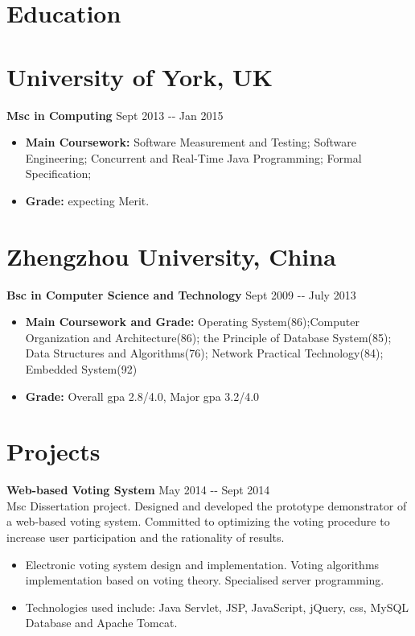\documentclass[margin]{res}
\begin{document}
  
\address{{\bf Present Address} \\ 37, Broadway west \\ 
York\\ YO10 4JN}
\address{{\bf Email Address} \\ fanlu91@gmail.com \\ {\bf Phone Number} \\
(044)7706 234389
}
\begin{resume} 
\section{Education} 
\section{University of York, UK} 
{\bf Msc in Computing } \hfill Sept
2013 -­‐ Jan 2015  \\
\begin{itemize}
  \item {\bf Main Coursework:} Software
  Measurement and Testing; Software Engineering; Concurrent and Real-Time Java Programming; Formal
Specification;
 \item  {\bf Grade:} expecting Merit.
\end{itemize}
\section{Zhengzhou University, China}  
{\bf Bsc in Computer Science and Technology } \hfill Sept 2009 -­‐ July 2013\\
\begin{itemize}
\item {\bf Main Coursework and Grade: } Operating System(86);Computer
Organization and Architecture(86); the Principle of Database System(85); Data
Structures and Algorithms(76); Network Practical Technology(84); Embedded
System(92)
\item {\bf Grade:} Overall gpa 2.8/4.0, Major gpa 3.2/4.0 
\end{itemize}
\section{Projects}
{\bf Web-based Voting System} \hfill May 2014 -­‐ Sept 2014\\
Msc Dissertation
project. Designed and developed the prototype demonstrator of a web-based voting
system. Committed to optimizing the voting procedure to increase user
participation and the rationality of results.
\begin{itemize}
  \item Electronic voting system design and implementation. Voting algorithms
  implementation based on voting theory. Specialised server programming.
\item Technologies used
include: Java Servlet, JSP, JavaScript, jQuery, css, MySQL Database and Apache
Tomcat.
\end{itemize}


\end{resume}
\end{document}
